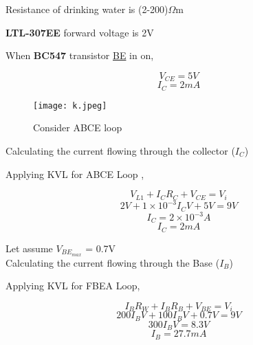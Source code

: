 \documentclass[12pt,a4paper,oneside]{book}
\theoremstyle{plain}
\numberwithin{equation}{chapter} \DeclareMathOperator{\Var}{Var}
\begin{document}
Resistance of drinking water is (2-200)$\Omega$m

\textbf{LTL-307EE} forward voltage is 2V

When \textbf{BC547} transistor \underline{BE} in on, 

\begin{center}
\begin{equation*}
V_{CE}=5V 
\end{equation*}
\begin{equation*}
I_{C}=2mA
\end{equation*}
\end{center}

\begin{figure}[hbt1]
    \centering
    \texttt{[image: k.jpeg]}
    \caption{Consider ABCE loop}
    \label{fig:k}
\end{figure}

\newpage

Calculating the current flowing through the collector (\textbf{$I_{C}$}) 

Applying KVL for ABCE Loop ,
\begin{center}
	\begin{equation}
	V_{L1}+I_{C}R_{C}+V_{CE} = V_{i}
	\end{equation}
	\begin{equation*}
	2V+1\times10^{-3}I_{C}V+5V = 9V
	\end{equation*}
	\begin{equation*}
	I_{C}=2\times10^{-3}A
	\end{equation*}
	\begin{equation*}
	I_{C}=2mA
	\end{equation*}
\end{center}
Let assume {$V_{BE_{max}}$} = 0.7V
\\
Calculating the current flowing through the Base (\textbf{$I_{B}$}) 

Applying KVL for FBEA Loop,

\begin{center}
\begin{equation}
I_{B}R_{W}+I_{B}R_{B}+V_{BE}=V_{i}
\end{equation}
\begin{equation*}
200I_{B}V+100I_{B}V+0.7V=9V
\end{equation*}
\begin{equation*}
300I_{B}V=8.3V
\end{equation*}
\begin{equation*}
I_{B}=27.7mA
\end{equation*}
\end{center}
\end{document}
